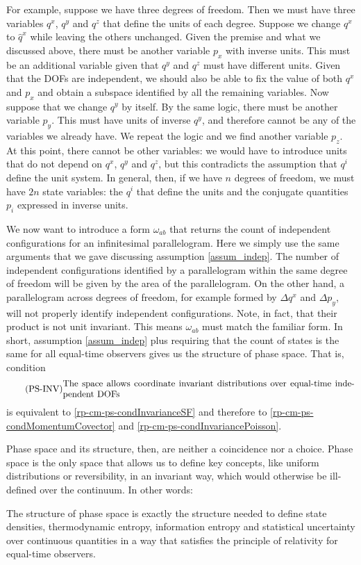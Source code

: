 For example, suppose we have three degrees of freedom. Then we must have three variables $q^x$, $q^y$ and $q^z$ that define the units of each degree. Suppose we change $q^x$ to $\hat{q}^x$ while leaving the others unchanged. Given the premise and what we discussed above, there must be another variable $p_x$ with inverse units. This must be an additional variable given that $q^y$ and $q^z$ must have different units. Given that the DOFs are independent, we should also be able to fix the value of both $q^x$ and $p_x$ and obtain a subspace identified by all the remaining variables. Now suppose that we change $q^y$ by itself. By the same logic, there must be another variable $p_y$. This must have units of inverse $q^y$, and therefore cannot be any of the variables we already have. We repeat the logic and we find another variable $p_z$. At this point, there cannot be other variables: we would have to introduce units that do not depend on $q^x$, $q^y$ and $q^z$, but this contradicts the assumption that $q^i$ define the unit system. In general, then, if we have $n$ degrees of freedom, we must have $2n$ state variables: the $q^i$ that define the units and the conjugate quantities $p_i$ expressed in inverse units.

We now want to introduce a form $\omega_{ab}$ that returns the count of independent configurations for an infinitesimal parallelogram. Here we simply use the same arguments that we gave discussing assumption \ref{assum_indep}. The number of independent configurations identified by a parallelogram within the same degree of freedom will be given by the area of the parallelogram. On the other hand, a parallelogram across degrees of freedom, for example formed by $\Delta q^x$ and $\Delta p_y$, will not properly identify independent configurations. Note, in fact, that their product is not unit invariant. This means $\omega_{ab}$ must match the familiar form. In short, assumption \ref{assum_indep} plus requiring that the count of states is the same for all equal-time observers gives us the structure of phase space. That is, condition
\begin{equation}\tag{PS-INV}\label{rp-cm-ps-condInvariantDensity}
	\eqtext{The space allows coordinate invariant distributions over equal-time  independent DOFs}
\end{equation}
is equivalent to \ref{rp-cm-ps-condInvarianceSF} and therefore to \ref{rp-cm-ps-condMomentumCovector} and \ref{rp-cm-ps-condInvariancePoisson}.

Phase space and its structure, then, are neither a coincidence nor a choice. Phase space is the only space that allows us to define key concepts, like uniform distributions or reversibility, in an invariant way, which would otherwise be ill-defined over the continuum. In other words:
\begin{insight}
	The structure of phase space is exactly the structure needed to define state densities, thermodynamic entropy, information entropy and statistical uncertainty over continuous quantities in a way that satisfies the principle of relativity for equal-time observers.
\end{insight}

